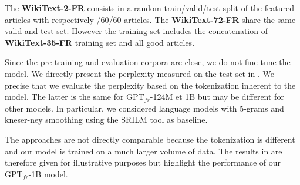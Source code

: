 The \textbf{WikiText-2-FR} consists in a random train/valid/test split of the featured articles with respectively /60/60 articles. The \textbf{WikiText-72-FR} share the same valid and test set. However the training set includes the concatenation of \textbf{WikiText-35-FR} training set and all good articles.

\begin{table}[!ht]
\footnotesize
{}
\caption{Descriptive statistics for the corpora \textbf{WikiText-FR}. We evaluate the vocabulary size using the MOSES tokenizer \parencite{koehn_07}. Tokens out of vocabulary correspond to those that occur less than three times.}
\end{table}

Since the pre-training and evaluation corpora are close, we do not fine-tune the model. We directly present the perplexity measured on the test set in . We precise that we evaluate the perplexity based on the tokenization inherent to the model. The latter is the same for $\text{GPT}_{fr}$-124M et 1B but may be different for other models. In particular, we considered language models with 5-grams and kneser-ney smoothing \parencite{ney_94} using the SRILM tool \parencite{stolcke_02} as baseline.

The approaches are not directly comparable because the tokenization is different and our model is trained on a much larger volume of data. The results in  are therefore given for illustrative purposes but highlight the performance of our $\text{GPT}_{fr}$-1B model. 

